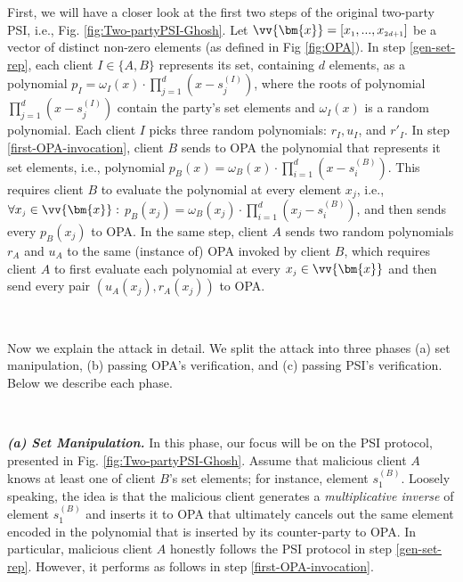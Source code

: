 First, we will have a closer look at  the first two steps of the original two-party PSI, i.e., Fig. \ref{fig:Two-partyPSI-Ghosh}. Let $\vv{\bm{x}}=[x_{\scriptscriptstyle 1},...,x_{\scriptscriptstyle 2d+1}]$ be a vector of distinct non-zero elements (as defined in Fig \ref{fig:OPA}). In step \ref{gen-set-rep}, each client $I\in\{A,B\}$ represents its set, containing $d$ elements, as a polynomial $p_{\scriptscriptstyle I}=\omega_{\scriptscriptstyle I}(x)\cdot \prod\limits^{\scriptscriptstyle d}_{\scriptscriptstyle j=1}(x-s^{\scriptscriptstyle (I)}_{\scriptscriptstyle j})$, where the roots of polynomial $\prod\limits^{\scriptscriptstyle d}_{\scriptscriptstyle j=1}(x-s^{\scriptscriptstyle (I)}_{\scriptscriptstyle j})$ contain the party's set elements and   $\omega_{\scriptscriptstyle I}(x)$ is a random polynomial. Each client $I$ picks three random polynomials: $r_{\scriptscriptstyle I}, u_{\scriptscriptstyle I}$, and $r'_{\scriptscriptstyle I}$. In  step  \ref{first-OPA-invocation},  client $B$ sends to OPA the polynomial that represents it set elements, i.e., polynomial $p_{\scriptscriptstyle B}(x)=\omega_{\scriptscriptstyle B}(x)\cdot\prod\limits^{\scriptscriptstyle d}_{\scriptscriptstyle i=1}(x-s^{\scriptscriptstyle(B)}_{\scriptscriptstyle i})$. This requires client $B$ to evaluate the polynomial at every element $x_{\scriptscriptstyle j}$, i.e.,   $\forall x_{\scriptscriptstyle j}\in \vv{\bm{x}}:$   $p_{\scriptscriptstyle B}(x_{\scriptscriptstyle j})=\omega_{\scriptscriptstyle B}(x_{\scriptscriptstyle j})\cdot\prod\limits^{\scriptscriptstyle d}_{\scriptscriptstyle i=1}(x_{\scriptscriptstyle j}-s^{\scriptscriptstyle(B)}_{\scriptscriptstyle i})$, and then  sends every $p_{\scriptscriptstyle B}(x_{\scriptscriptstyle j})$ to   OPA. In the same step, client $A$ sends two random polynomials  $r_{\scriptscriptstyle A}$ and $u_{\scriptscriptstyle A}$ to the same (instance of) OPA invoked by client $B$, which requires client $A$ to first evaluate each polynomial at every $x_{\scriptscriptstyle j}\in\vv{\bm{x}}$ and then  send every pair  $(u_{\scriptscriptstyle A}(x_{\scriptscriptstyle j}), r_{\scriptscriptstyle A}(x_{\scriptscriptstyle j}))$ to  OPA. 


\

Now we explain the attack in detail. We split the attack into three phases (a) set  manipulation, (b) passing OPA’s verification, and (c)  passing PSI’s verification. Below we describe each phase. 

\

 \noindent\textit{\textbf{(a) Set  Manipulation.}} In this phase,  our focus will be on the PSI protocol, presented in Fig. \ref{fig:Two-partyPSI-Ghosh}.  Assume that malicious client $A$ knows at least one of  client $B$'s set elements; for instance, element  $s^{\scriptscriptstyle(B)}_{\scriptscriptstyle 1}$. Loosely speaking, the idea is that the malicious client  generates a \emph{multiplicative inverse} of  element $s^{\scriptscriptstyle(B)}_{\scriptscriptstyle 1}$ and inserts it to OPA that  ultimately  cancels out the same element encoded in the polynomial that is  inserted by its counter-party to OPA.   In particular,  malicious client $A$ honestly follows the PSI protocol in step \ref{gen-set-rep}. However, it performs as follows in step \ref{first-OPA-invocation}.

